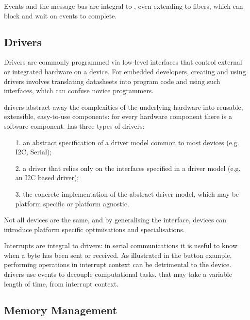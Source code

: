 Events and the message bus are integral to \CON, even extending to fibers, which can block and wait on events to complete. 

\subsection{Drivers}

Drivers are commonly programmed via low-level interfaces that control external or integrated hardware on a device. For embedded developers, creating and using drivers involves translating datasheets into program code and using such interfaces, which can confuse novice programmers.

\CO drivers abstract away the complexities of the underlying hardware into reusable, extensible, easy-to-use components: for every hardware component there is a software component. \CO has three types of drivers: 
\begin{itemize}
    \item[1.] an abstract specification of a driver model common to most devices (e.g. I2C, Serial); 
    \item[2.] a driver that relies only on the interfaces specified in a driver model  (e.g. an I2C based driver);
    \item[3.] the concrete implementation of the abstract driver model, which may be platform specific or platform agnostic. 
\end{itemize}
Not all devices are the same, and by generalising the interface, devices can introduce platform specific optimisations and specialisations.

Interrupts are integral to drivers: in serial communications it is useful to know when a byte has been sent or received. As illustrated in the button example, performing operations in interrupt context can be detrimental to the device. \CO drivers use events to decouple computational tasks, that may take a variable length of time, from interrupt context.


\subsection{Memory Management}

